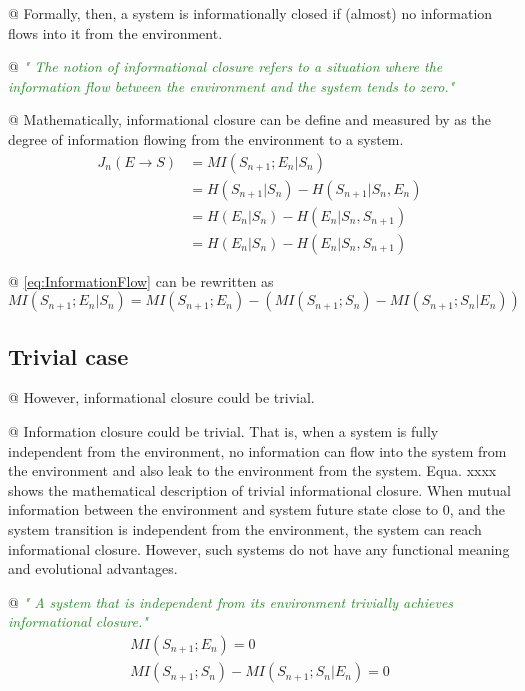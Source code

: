 \documentclass[utf8]{article}
\newenvironment{ants}
			{
			 \begin{easylist}[itemize]		
		 	}
			{
			\end{easylist}
			}
\newcommand{\rewrite}[1]{\textcolor{ForestGreen}{\textit{"#1"}}\newline}
\begin{document}
			
			\begin{ants}				
				@ Formally, then, a system is informationally closed if (almost) no information flows into it from the environment.
				
				@ \rewrite{
					The notion of informational closure refers to a situation where the information flow between the environment and the system tends to zero.} \cite{BERTSCHINGER.2006}
				
				@ Mathematically, informational closure can be define and measured by as the degree of information flowing from the environment to a system.
				\begin{equation}\label{eq:InformationFlow}
				\left.\begin{array}
				{rl}{J_{n}(E \rightarrow S )} & { = MI(S_{n+1};E_{n}|S_{n})} \\
				{ } & { = H(S_{n+1}|S_{n})-H(S_{n+1}|S_{n},E_{n})} \\
				{ } & { = H(E_{n}|S_{n})-H(E_{n}|S_{n},S_{n+1})} \\
				{ } & { = H(E_{n}|S_{n})-H(E_{n}|S_{n},S_{n+1})}
				\end{array}\right.
				\end{equation}
				
				
				@ \ref{eq:InformationFlow} can be rewritten as 
				\begin{equation}
				MI(S_{n+1};E_{n}|S_{n}) = 
				MI(S_{n+1};E_{n}) - (MI(S_{n+1};S_{n})-MI(S_{n+1};S_{n}|E_{n}))
				\end{equation}
				
			\end{ants}
		
		
		
		\subsection{Trivial case}
			\begin{ants}
				@ However, informational closure could be trivial.
				
				@ Information closure could be trivial. That is, when a system is fully independent from the environment, no information can flow into the system from the environment and also leak to the environment from the system. Equa. xxxx shows the mathematical description of trivial informational closure. When mutual information between the environment and system future state close to 0, and the system transition is independent from the environment, the system can reach informational closure. However, such systems do not have any functional meaning and evolutional advantages.
	
				@ \rewrite{
					A system that is independent from its environment trivially achieves informational closure.}  \cite{BERTSCHINGER.2006}
					\begin{equation}
						\left.\begin{array}
						{l}{MI(S_{n+1};E_{n})=0}\\
						{MI(S_{n+1};S_{n})-MI(S_{n+1};S_{n}|E_{n})=0}
						\end{array}\right.
					\end{equation}
			\end{ants}
		
\end{document}

